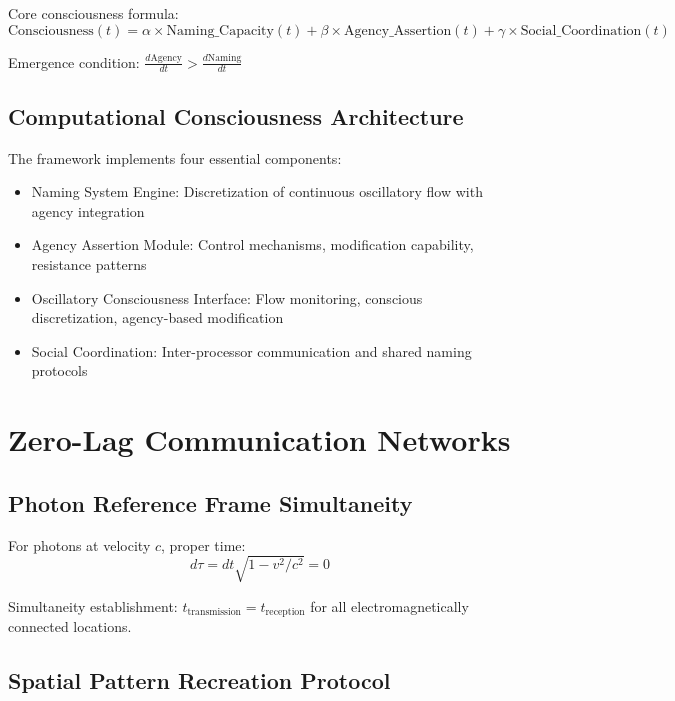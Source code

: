 \documentclass[12pt,a4paper]{article}
\begin{document}
Core consciousness formula:
\begin{equation}
\text{Consciousness}(t) = \alpha \times \text{Naming\_Capacity}(t) + \beta \times \text{Agency\_Assertion}(t) + \gamma \times \text{Social\_Coordination}(t)
\end{equation}

Emergence condition: $\frac{d\text{Agency}}{dt} > \frac{d\text{Naming}}{dt}$

\subsection{Computational Consciousness Architecture}

The framework implements four essential components:

\begin{itemize}
\item Naming System Engine: Discretization of continuous oscillatory flow with agency integration
\item Agency Assertion Module: Control mechanisms, modification capability, resistance patterns
\item Oscillatory Consciousness Interface: Flow monitoring, conscious discretization, agency-based modification
\item Social Coordination: Inter-processor communication and shared naming protocols
\end{itemize}

\section{Zero-Lag Communication Networks}

\subsection{Photon Reference Frame Simultaneity}

For photons at velocity $c$, proper time:
\begin{equation}
d\tau = dt\sqrt{1-v^2/c^2} = 0
\end{equation}

Simultaneity establishment: $t_{\text{transmission}} = t_{\text{reception}}$ for all electromagnetically connected locations.

\subsection{Spatial Pattern Recreation Protocol}
\end{document}
